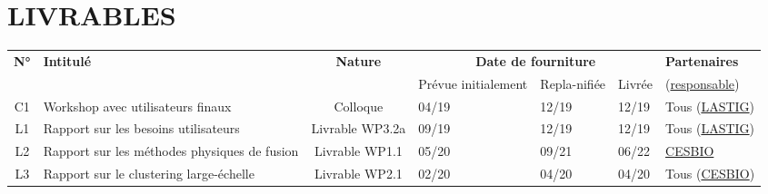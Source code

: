 \section{LIVRABLES}
\label{sec:livrables}




\begin{table}[htbp]
\small
    \centering
    \begin{tabular}{|c|p{4.75cm}|c|p{1.25cm}|p{1.25cm}|p{1.25cm}|p{2.55cm}|}
    \hline
\multirow{2}{*}{\textbf{N°}} & \multirow{2}{*}{\textbf{Intitulé}} & \multirow{2}{*}{\textbf{Nature}} & \multicolumn{3}{|c|}{\textbf{Date de fourniture}} & \textbf{Partenaires}\\\cline{4-6}
 & & & Prévue initialement & Repla-nifiée & Livrée & (\underline{responsable}) \\
\hline

C1 &Workshop avec utilisateurs finaux & Colloque  &04/19 &12/19 &12/19 & Tous (\underline{LASTIG}) \\
\hline \hline
L1 & Rapport sur les besoins utilisateurs & Livrable WP3.2a  &09/19 & 12/19 & 12/19 & Tous (\underline{LASTIG}) \\
\hline
L2 & Rapport sur les méthodes physiques de fusion & Livrable WP1.1  &05/20 &09/21 & 06/22 & \underline{CESBIO} \\
\hline
L3 & Rapport sur le clustering large-échelle & Livrable WP2.1  &02/20 & 04/20 & 04/20 & Tous (\underline{CESBIO}) \\
\hline
    \end{tabular}
    \label{tab:my_label}
\end{table}